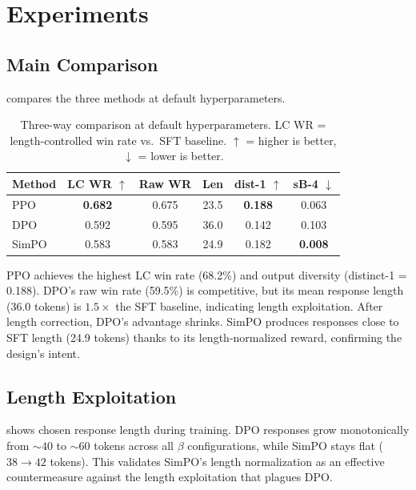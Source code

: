 \documentclass[10pt,twocolumn,letterpaper]{article}
\begin{document}
\section{Experiments}

\subsection{Main Comparison}

 compares the three methods at default hyperparameters.

\begin{table}[t]
\centering
\small
\caption{Three-way comparison at default hyperparameters. LC WR = length-controlled win rate vs.\ SFT baseline. $\uparrow$ = higher is better, $\downarrow$ = lower is better.}
\label{tab:main}
\begin{tabular}{lccccc}
\toprule
Method & LC WR $\uparrow$ & Raw WR & Len & dist-1 $\uparrow$ & sB-4 $\downarrow$ \\
\midrule
PPO    & \textbf{0.682} & 0.675 & 23.5 & \textbf{0.188} & 0.063 \\
DPO    & 0.592 & 0.595 & 36.0 & 0.142 & 0.103 \\
SimPO  & 0.583 & 0.583 & 24.9 & 0.182 & \textbf{0.008} \\
\bottomrule
\end{tabular}
\end{table}

PPO achieves the highest LC win rate (68.2\%) and output diversity (distinct-1 = 0.188). DPO's raw win rate (59.5\%) is competitive, but its mean response length (36.0 tokens) is $1.5\times$ the SFT baseline, indicating length exploitation. After length correction, DPO's advantage shrinks. SimPO produces responses close to SFT length (24.9 tokens) thanks to its length-normalized reward, confirming the design's intent.

\subsection{Length Exploitation}

 shows chosen response length during training. DPO responses grow monotonically from ${\sim}40$ to ${\sim}60$ tokens across all $\beta$ configurations, while SimPO stays flat ($38 \to 42$ tokens). This validates SimPO's length normalization as an effective countermeasure against the length exploitation that plagues DPO.
\end{document}
